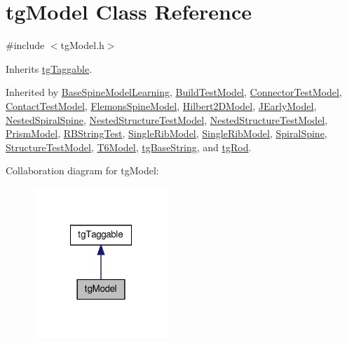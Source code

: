 \hypertarget{classtg_model}{\section{tg\-Model Class Reference}
\label{classtg_model}
}


{\ttfamily \#include $<$tg\-Model.\-h$>$}



Inherits \hyperlink{classtg_taggable}{tg\-Taggable}.



Inherited by \hyperlink{class_base_spine_model_learning}{Base\-Spine\-Model\-Learning}, \hyperlink{class_build_test_model}{Build\-Test\-Model}, \hyperlink{class_connector_test_model}{Connector\-Test\-Model}, \hyperlink{class_contact_test_model}{Contact\-Test\-Model}, \hyperlink{class_flemons_spine_model}{Flemons\-Spine\-Model}, \hyperlink{class_hilbert2_d_model}{Hilbert2\-D\-Model}, \hyperlink{class_j_early_model}{J\-Early\-Model}, \hyperlink{class_nested_spiral_spine}{Nested\-Spiral\-Spine}, \hyperlink{class_nested_structure_test_model}{Nested\-Structure\-Test\-Model}, \hyperlink{class_nested_structure_test_model}{Nested\-Structure\-Test\-Model}, \hyperlink{class_prism_model}{Prism\-Model}, \hyperlink{class_r_b_string_test}{R\-B\-String\-Test}, \hyperlink{class_single_rib_model}{Single\-Rib\-Model}, \hyperlink{class_single_rib_model}{Single\-Rib\-Model}, \hyperlink{class_spiral_spine}{Spiral\-Spine}, \hyperlink{class_structure_test_model}{Structure\-Test\-Model}, \hyperlink{class_t6_model}{T6\-Model}, \hyperlink{classtg_base_string}{tg\-Base\-String}, and \hyperlink{classtg_rod}{tg\-Rod}.



Collaboration diagram for tg\-Model\-:\nopagebreak
\begin{figure}[H]
\begin{center}
\leavevmode
\includegraphics[width=144pt]{classtg_model__coll__graph}
\end{center}
\end{figure}
